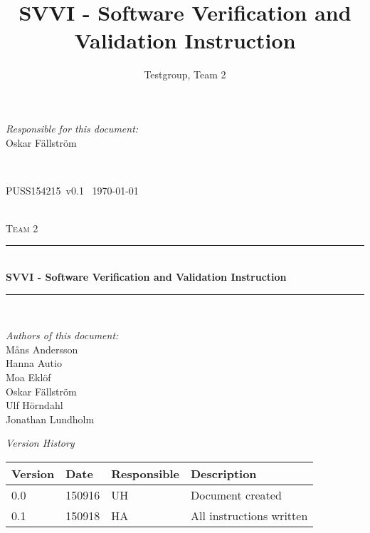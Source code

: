 \documentclass[a4paper]{article}
\title{SVVI - Software Verification and Validation Instruction}
\author{Testgroup, Team 2}
\newcommand{\version}{v0.1}
\newcommand{\SVVI}{PUSS154215}
\begin{document}
\begin{titlepage}
\newcommand{\HRule}{\rule{\linewidth}{0.5mm}}

\begin{minipage}{0.5\textwidth}
\begin{flushleft} %
\textit{Responsible for this document:}\\
Oskar Fällström %
\end{flushleft}
\end{minipage}
~
\begin{minipage}{0.4\textwidth}
\begin{flushright}
\SVVI\ \version\ %
\today
\end{flushright}
\end{minipage}\\[3cm]

\centering
\textsc{\LARGE Team 2}\\[0.5cm]

\HRule \\[0.4cm]
{ \huge \bfseries SVVI - Software Verification and Validation Instruction }\\[0.4cm] %
\HRule \\[1.5cm]

\vfill
\begin{flushleft}
\textit{Authors of this document:}\\
Måns Andersson \\
Hanna Autio \\
Moa Eklöf \\
Oskar Fällström \\
Ulf Hörndahl \\
Jonathan Lundholm
\end{flushleft}


\end{titlepage}

\begin{center}
\textit{\large Version History}

    \begin{tabular}{ | l | l | l | p{5cm} |}
    \hline
    \textbf{Version}		& \textbf{Date}		& \textbf{Responsible}					& \textbf{Description}					\\ \hline
    0.0						& 150916 			& UH									& Document created						\\ \hline
    0.1						& 150918			& HA									& All instructions written				\\ \hline
    \end{tabular}
\end{center}
\end{document}
